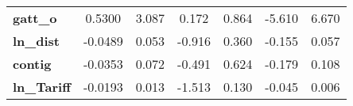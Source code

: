 \begin{center}
\begin{tabular}{lcccccc}
\textbf{gatt\_o}                                                   &       0.5300  &        3.087     &     0.172  &         0.864        &       -5.610    &        6.670     \\
\textbf{ln\_dist}                                                  &      -0.0489  &        0.053     &    -0.916  &         0.360        &       -0.155    &        0.057     \\
\textbf{contig}                                                    &      -0.0353  &        0.072     &    -0.491  &         0.624        &       -0.179    &        0.108     \\
\textbf{ln\_Tariff}                                                &      -0.0193  &        0.013     &    -1.513  &         0.130        &       -0.045    &        0.006     \\
\bottomrule
\end{tabular}
\end{center}